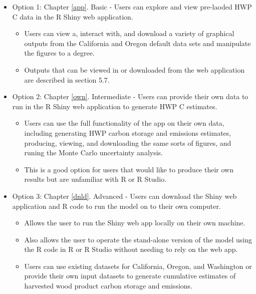 \documentclass[
  openany]{book}
\providecommand{\tightlist}{%
  \setlength{\itemsep}{0pt}\setlength{\parskip}{0pt}}
\begin{document}
\begin{itemize}
\tightlist
\item
  Option 1: Chapter \ref{app}. Basic - Users can explore and view pre-laoded HWP C data in the R Shiny web application.

  \begin{itemize}
  \tightlist
  \item
    Users can view a, interact with, and download a variety of graphical outputs from the California and Oregon default data sets and manipulate the figures to a degree.
  \item
    Outputs that can be viewed in or downloaded from the web application are described in section 5.7.\\
  \end{itemize}
\item
  Option 2: Chapter \ref{own}. Intermediate - Users can provide their own data to run in the R Shiny web application to generate HWP C estimates.

  \begin{itemize}
  \tightlist
  \item
    Users can use the full functionality of the app on their own data, including generating HWP carbon storage and emissions estimates, producing, viewing, and downloading the same sorts of figures, and runing the Monte Carlo uncertainty analysis.\\
  \item
    This is a good option for users that would like to produce their own results but are unfamiliar with R or R Studio.
  \end{itemize}
\item
  Option 3: Chapter \ref{dnld}. Advanced - Users can download the Shiny web application and R code to run the model on to their own computer.

  \begin{itemize}
  \tightlist
  \item
    Allows the user to run the Shiny web app locally on their own machine.\\
  \item
    Also allows the user to operate the stand-alone version of the model using the R code in R or R Studio without needing to rely on the web app.
  \item
    Users can use existing datasets for California, Oregon, and Washington or provide their own input datasets to generate cumulative estimates of harvested wood product carbon storage and emissions.
  \end{itemize}
\end{itemize}
\end{document}
